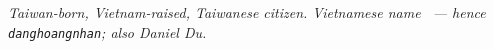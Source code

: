 %
%
%
%
%
%
\vspace{-2pt}

{\small\textit{Taiwan-born, Vietnam-raised, Taiwanese citizen. Vietnamese name
\vnname\ --- hence \texttt{danghoangnhan}; also Daniel Du.}}

